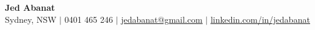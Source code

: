 \begin{center}
    {\Huge \textbf{Jed Abanat}} \\
        \vspace{4pt}
        Sydney, NSW $|$
        0401 465 246 $|$ 
        \href{mailto:jedabanat@gmail.com}{\underline{jedabanat@gmail.com}} $|$ 
        \href{https://linkedin.com/in/jedabanat}{\underline{linkedin.com/in/jedabanat}}
\end{center}